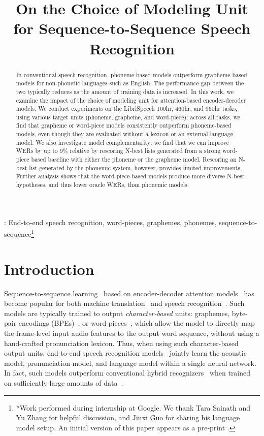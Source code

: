 \documentclass[a4paper]{article}
\title{On the Choice of Modeling Unit for Sequence-to-Sequence Speech Recognition}
\let\svthefootnote\thefootnote
\begin{document}
\maketitle
\begin{abstract}
In conventional speech recognition, phoneme-based models
outperform grapheme-based models for non-phonetic languages such as English.
The performance gap between the two typically reduces as the amount of training data
is increased.
In this work, we examine the impact of the choice of modeling unit for
attention-based encoder-decoder models.
We conduct experiments on the LibriSpeech 100hr, 460hr, and 960hr tasks, using
various target units (phoneme, grapheme, and word-piece);
across all tasks, we find that grapheme or word-piece models consistently
outperform phoneme-based models, even though they are evaluated without a
lexicon or an external language model.
We also investigate model complementarity: we find that we can improve WERs by up to 9\% relative by
rescoring N-best lists generated from a strong word-piece based baseline with either the
phoneme or the grapheme model.
Rescoring an N-best list generated by the phonemic system, however, provides
limited improvements.
Further analysis shows that the word-piece-based models produce more diverse
N-best hypotheses, and thus lower oracle WERs, than phonemic models.
\end{abstract}
:
End-to-end speech recognition, word-pieces, graphemes, phonemes, sequence-to-sequence\let\thefootnote\relax\footnote{*Work performed during internship at Google.
We thank Tara Sainath and Yu Zhang for helpful discussion,
and Jinxi Guo for sharing his language model setup.
An initial version of this paper appears as a pre-print \cite{irie2019}.}
\addtocounter{footnote}{-1}\let\thefootnote\svthefootnote
\vspace{-2mm}
\section{Introduction}
\label{sec:intro}
Sequence-to-sequence learning~\cite{seq2seq} based on encoder-decoder attention
models~\cite{bahdanau2014neural} has become popular for both machine
translation~\cite{wu2016google} and speech recognition~\cite{RPis2017,
KimHW17, battenberg2017exploring, WengCWWYSY18, ChiuSWPNCKWRGJL18}.
Such models are typically trained to output \emph{character-based} units:
graphemes, byte-pair encodings (BPEs)~\cite{sennrich16bpe}, or
word-pieces~\cite{SchusterN12}, which allow the model to directly map
the frame-level input audio features to the
output word sequence, without using a hand-crafted pronunciation lexicon.
Thus, when using such character-based output units, end-to-end speech
recognition models~\cite{lasicassp2016} jointly learn the acoustic model,
pronunciation model, and language model within a single neural network.
In fact, such models outperform conventional hybrid recognizers~\cite{Bourlard1993} when trained on
sufficiently large amounts of data~\cite{ChiuSWPNCKWRGJL18}.
\end{document}
